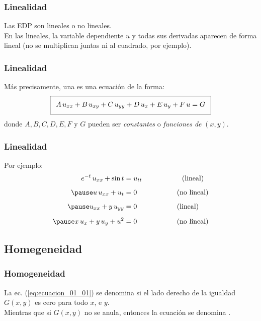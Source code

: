 \documentclass[12pt]{beamer}
\begin{document}
\begin{frame}
\frametitle{Linealidad}
Las EDP son lineales o no lineales. 
\\
\bigskip
\pause
En las lineales, la variable dependiente $u$ y todas sus derivadas aparecen de forma lineal (no se multiplican juntas ni al cuadrado, por ejemplo).
\end{frame}
\begin{frame}
\frametitle{Linealidad}
Más precisamente, una  es una ecuación de la forma:
\pause
\begin{align}
\addtolength{\fboxsep}{5pt}\boxed{ A \, u_{xx} + B \, u_{xy} + C \, u_{yy} + D \, u_{x} + E \, u_{y} + F \, u = G}
\label{eq:ecuacion_01_01}
\end{align}
donde $A, B, C, D, E, F$ y $G$ pueden ser \emph{constantes} o \emph{funciones de} $(x, y)$.
\end{frame}
\begin{frame}
\frametitle{Linealidad}
Por ejemplo:
\begin{eqnarray*}
\begin{aligned}
e^{-t} \, u_{xx} + \sin t &= u_{tt} \hspace{2cm} \mbox{(lineal)} \\[0.5em] \pause
u \, u_{xx} + u_{t} &= 0 \hspace{2cm} \mbox{(no lineal)} \\[0.5em] \pause
u_{xx} + y \, u_{yy} &= 0 \hspace{2cm} \mbox{(lineal)} \\[0.5em] \pause
x \, u_{x} + y \, u_{y} + u^{2} &= 0 \hspace{2cm} \mbox{(no lineal)}
\end{aligned}
\end{eqnarray*}
\end{frame}

\subsection*{Homegeneidad}

\begin{frame}
\frametitle{Homogeneidad}
La ec. (\ref{eq:ecuacion_01_01}) se denomina  si el lado derecho de la igualdad $G (x, y)$ es cero para todo $x$, e $y$.
\\
\bigskip
\pause
Mientras que si $G (x, y)$ no se anula, entonces la ecuación se denomina .
\end{frame}
\end{document}
